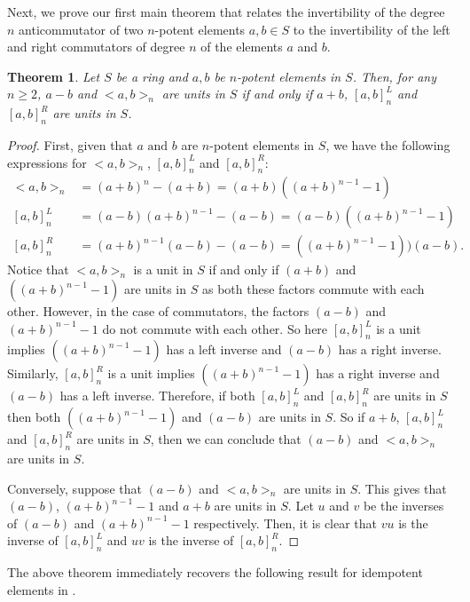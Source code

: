 \documentclass[12pt]{amsart}
\newtheorem{theorem}{Theorem}[section]
\theoremstyle{definition}
\numberwithin{equation}{section}
\begin{document}
Next, we prove our first main theorem that relates the invertibility of the degree $n$ anticommutator of two $n$-potent elements $a,b \in S$ to the invertibility of the left and right commutators of degree $n$ of the elements $a$ and $b$. 
\begin{theorem}\label{THM: Invertability of anticommutator vs commutator}
 Let $S$ be a ring and $a,b$ be $n$-potent elements in $S$. Then, for any $n \geq 2$,  $a-b$ and $<a,b>_n$ are units in $S$ if and only if $a+b$, $[a,b]_n^L$ and $[a,b]_n^R$ are units in $S$.  
\end{theorem}
\begin{proof}
 First, given that $a \text{ and } b$ are $n$-potent elements in $S$, we have the following expressions for $<a,b>_n$, $[a,b]_n^L$ and $[a,b]_n^R$:
 \begin{align*}
     <a,b>_n&=(a+b)^n-(a+b)=(a+b)((a+b)^{n-1}-1)\\
     [a,b]_n^L&=(a-b)(a+b)^{n-1}-(a-b)=(a-b)((a+b)^{n-1}-1)\\
     [a,b]_n^R&=(a+b)^{n-1}(a-b)-(a-b)=((a+b)^{n-1}-1))(a-b).
 \end{align*}
\noindent Notice that $ <a,b>_n$ is a unit in $S$ if and only if  $(a+b)$ and $((a+b)^{n-1}-1)$ are units in $S$ as both these factors commute with each other. However, in the case of commutators, the factors $(a-b)$ and $(a+b)^{n-1}-1$ do not commute with each other. So here $[a,b]_n^L$ is a unit implies $((a+b)^{n-1}-1)$ has a left inverse and $(a-b)$ has a right inverse. Similarly, $[a,b]_n^R$ is a unit implies $((a+b)^{n-1}-1)$ has a right inverse and $(a-b)$ has a left inverse. Therefore, if both $[a,b]_n^L$ and $[a,b]_n^R$ are units in $S$ then both $((a+b)^{n-1}-1)$ and $(a-b)$ are units in $S$. So if $a+b$, $[a,b]_n^L$ and $[a,b]_n^R$ are units in $S$, then we can conclude that $(a-b)$ and $ <a,b>_n$ are units in $S$. 

Conversely, suppose that $(a-b)$ and $ <a,b>_n$ are units in $S$. 
This gives that $(a-b)$, $(a+b)^{n-1}-1$ and $a+b$ are units in $S$. Let $u$ and $v$ be the inverses of $(a-b)$ and $(a+b)^{n-1}-1$ respectively. Then, it is clear that $vu$ is the inverse of $[a,b]_n^L$ and $uv$ is the inverse of $[a,b]_n^R$.
\end{proof}
\noindent The above theorem immediately recovers the following result for idempotent elements in \cite{khurana2018idempotents}.
\end{document}
